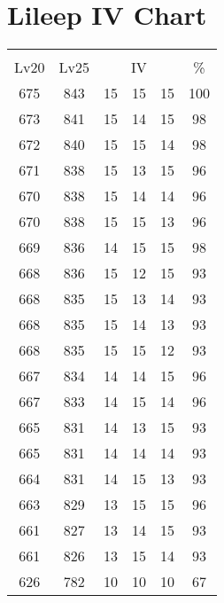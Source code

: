 \documentclass{article}%
\begin{document}
%
\normalsize%
\section{Lileep IV Chart}%
\label{sec:Lileep IV Chart}%
\renewcommand{\arraystretch}{1.5}%
\begin{tabular}{|c|c|c|c|c|c|}%
\hline%
\multicolumn{6}{|c|}{\textcolor{white}{ 
\linebreak{Lileep}
}%
\cellcolor{black}}\\%
\multicolumn{1}{|c}{Lv20}&\multicolumn{1}{c|}{Lv25}&\multicolumn{3}{c|}{IV}&\multicolumn{1}{|c|}{\%}\\%
\hline%
\rowcolor{color100}%
675&843&15&15&15&100\\%
\hline%
\rowcolor{color98}%
673&841&15&14&15&98\\%
\hline%
\rowcolor{color98}%
672&840&15&15&14&98\\%
\hline%
\rowcolor{color96}%
671&838&15&13&15&96\\%
\hline%
\rowcolor{color96}%
670&838&15&14&14&96\\%
\hline%
\rowcolor{color96}%
670&838&15&15&13&96\\%
\hline%
\rowcolor{color98}%
669&836&14&15&15&98\\%
\hline%
\rowcolor{color93}%
668&836&15&12&15&93\\%
\hline%
\rowcolor{color93}%
668&835&15&13&14&93\\%
\hline%
\rowcolor{color93}%
668&835&15&14&13&93\\%
\hline%
\rowcolor{color93}%
668&835&15&15&12&93\\%
\hline%
\rowcolor{color96}%
667&834&14&14&15&96\\%
\hline%
\rowcolor{color96}%
667&833&14&15&14&96\\%
\hline%
\rowcolor{color93}%
665&831&14&13&15&93\\%
\hline%
\rowcolor{color93}%
665&831&14&14&14&93\\%
\hline%
\rowcolor{color93}%
664&831&14&15&13&93\\%
\hline%
\rowcolor{color96}%
663&829&13&15&15&96\\%
\hline%
\rowcolor{color93}%
661&827&13&14&15&93\\%
\hline%
\rowcolor{color93}%
661&826&13&15&14&93\\%
\hline%
\rowcolor{color91}%
626&782&10&10&10&67\\%
\end{tabular}

%
\end{document}

